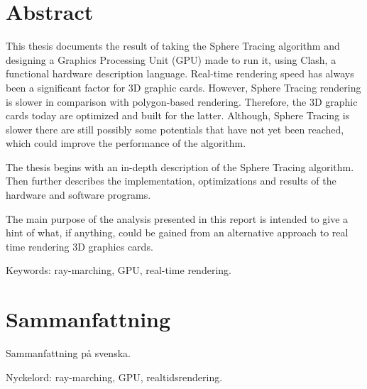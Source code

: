 \thispagestyle{plain}			%
\setlength{\parskip}{0pt plus 1.0pt}
\section*{Abstract}
	
	This thesis documents the result of taking the Sphere Tracing algorithm
	and designing a Graphics Processing Unit (GPU) made to run it, using Clash,
	a functional hardware description language. Real-time rendering speed has
	always been a significant factor for 3D graphic cards. However, Sphere
	Tracing rendering is slower in comparison with polygon-based rendering. 
	Therefore, the 3D graphic cards today are optimized and built for the latter.
	Although, Sphere Tracing is slower there are still possibly some potentials
	that have not yet been reached, which could improve the performance of the algorithm.
	
	The thesis begins with an in-depth description of the Sphere Tracing algorithm.
	Then further describes the implementation, optimizations and results of the 
	hardware and software programs. 
	
	The main purpose of the analysis presented in this report is intended to give 
	a hint of what, if anything, could be gained from an alternative approach to 
	real time rendering 3D graphics cards.

	\vfill
	Keywords: ray-marching, GPU, real-time rendering.

\newpage
\thispagestyle{plain}

\section*{Sammanfattning}
	
	Sammanfattning på svenska.
	
	\vfill
	Nyckelord: ray-marching, GPU, realtidsrendering.


\newpage
\thispagestyle{empty}
\mbox{}
